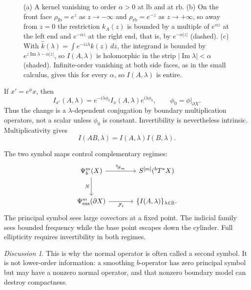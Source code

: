 \documentclass[12pt,oneside,reqno]{article}
\theoremstyle{plain}
\theoremstyle{definition}
\theoremstyle{remark}
\newtheorem*{discussion}{Discussion}
\begin{document}
\begin{figure}[htbp]
\caption[Side-face orders and strips of holomorphy]{(a) A kernel
vanishing to order \(\alpha>0\) at \(\mathrm{lb}\) and at
\(\mathrm{rb}\).  (b) On the front face \(\rho_{\mathrm{lb}}=e^{z}\) as
\(z\to-\infty\) and \(\rho_{\mathrm{rb}}=e^{-z}\) as \(z\to+\infty\), so
away from \(z=0\) the restriction \(k_A(z)\) is bounded by a multiple of
\(e^{\alpha z}\) at the left end and \(e^{-\alpha z}\) at the right end,
that is, by \(e^{-\alpha|z|}\) (dashed).  (c) With
\(\widehat k(\lambda)=\int e^{-iz\lambda}k(z)\,dz\), the integrand is
bounded by \(e^{z\operatorname{Im}\lambda-\alpha|z|}\), so \(I(A,\lambda)\)
is holomorphic in the strip \(|\operatorname{Im}\lambda|<\alpha\) (shaded).
Infinite-order vanishing at both side faces, as in the small calculus,
gives this for every \(\alpha\), so \(I(A,\lambda)\) is entire.}
\label{fig:strip}
\end{figure}

If \(x'=e^\phi x\), then
\[
 I_{x'}(A,\lambda)
 =e^{-i\lambda\phi_0}I_x(A,\lambda)e^{i\lambda\phi_0},
 \qquad \phi_0=\phi|_{\partial X}.
\]
Thus the change is a \(\lambda\)-dependent conjugation by boundary
multiplication operators, not a scalar unless \(\phi_0\) is constant.
Invertibility is nevertheless intrinsic. Multiplicativity gives
\[
 I(AB,\lambda)=I(A,\lambda)I(B,\lambda).
\]

The two symbol maps control complementary regimes:
\[
\begin{tikzcd}[column sep=large,row sep=large]
 \Psi_b^m(X)
   \arrow[r,"{}^b\!\sigma_m"]
   \arrow[d,"N"']
 & S^{[m]}({}^bT^*X) \\
 \Psi_{\mathrm{sus}}^m(\partial X)
   \arrow[r,"\mathcal F_t"']
 & \{I(A,\lambda)\}_{\lambda\in\mathbb R} .
\end{tikzcd}
\]
The principal symbol sees large covectors at a fixed point. The indicial
family sees bounded frequency while the base point escapes down the
cylinder. Full ellipticity requires invertibility in both regimes.

\begin{discussion}
This is why the normal operator is often called a second symbol. It is not
lower-order information: a smoothing \(b\)-operator has zero principal
symbol but may have a nonzero normal operator, and that nonzero boundary
model can destroy compactness.
\end{discussion}
\end{document}
